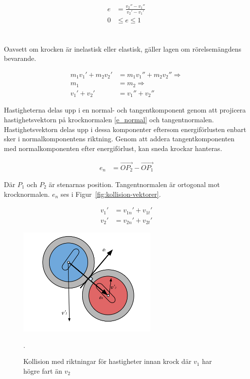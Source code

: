 \documentclass[11pt]{article} %
\begin{document}
 \begin{subequations}\label{e1}
 \begin{align}
 e& = \frac{v_2''-v_1''}{v_2'-v_1'}\\
0& \le e \le 1
 \end{align}
 \end{subequations}
\\\\Oavsett om krocken är inelastisk eller elastisk, gäller lagen om rörelsemängdens bevarande.

 \begin{subequations}\label{elastisk}
 \begin{align}
m_1 v_1' + m_2 v_2'& = m_1 v_1'' + m_2 v_2'' \Rightarrow\\
m_1& = m_2 \Rightarrow\\
v_1' + v_2'& = v_1'' + v_2'' \label{momentum}
 \end{align}
 \end{subequations}

\pagebreak

Hastigheterna delas upp i en normal- och tangentkomponent genom att projicera hastighetsvektorn på krocknormalen \eqref{e_normal} och tangentnormalen. Hastighetsvektorn delas upp i dessa komponenter eftersom energiförlusten enbart sker i normalkomponentens riktning. Genom att addera tangentkomponenten med normalkomponenten efter energiförlust, kan sneda krockar hanteras.

 \begin{align}\label{e_normal}
e_n& = \overrightarrow{OP_2} -  \overrightarrow{OP_1}  
 \end{align}

Där $P_1$ och $P_2$ är stenarnas position. Tangentnormalen är ortogonal mot krocknormalen. $e_n$ ses i Figur~\ref{fig:kollision-vektorer}. 

 \begin{align}\label{vCollision}
v_1'& = v_{1n}' + v_{1t}'\\
v_2'& = v_{2n}' + v_{2t}'
 \end{align}

\begin{figure}[ht!]
\centering
\includegraphics[width=69mm]{kollision-vektorer.png}
\caption{Kollision med riktningar för hastigheter innan krock där $v_{1}$ har högre fart än $v_{2}$}.
\label{fig:kollision-vektorer}
\label{overflow}
\end{figure}
\end{document}
